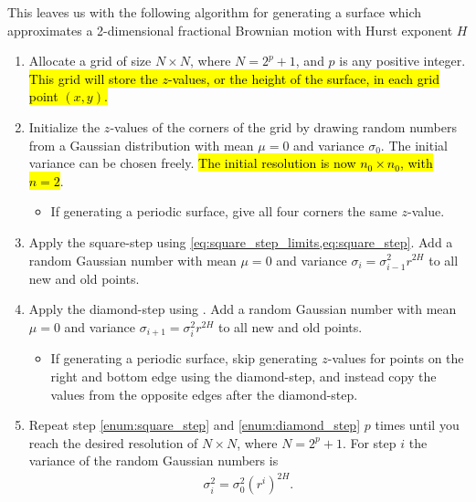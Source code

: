 This leaves us with the following algorithm for generating a surface which approximates a 2-dimensional fractional Brownian motion with Hurst exponent $H$
\begin{enumerate}
    \renewcommand{\labelitemii}{$\bullet$}
    
    \item Allocate a grid of size $N\times N$, where $N = 2^p + 1$, and $p$ is any positive integer. \hl{This grid will store the $z$-values, or the height of the surface, in each grid point $(x,y)$.}

    \item Initialize the $z$-values of the corners of the grid by drawing random numbers from a Gaussian distribution with mean $\mu = 0$ and variance $\sigma_0$. The initial variance can be chosen freely. \hl{The initial resolution is now $n_0\times n_0$, with $n = 2$}.
    \begin{itemize}
        \item If generating a periodic surface, give all four corners the same $z$-value.
    \end{itemize}
    
    \item Apply the square-step using \cref{eq:square_step_limits,eq:square_step}. Add a random Gaussian number with mean $\mu = 0$ and variance $\sigma_i = \sigma_{i-1}^2r^{2H}$ to all new and old points.
    \label{enum:square_step}

    \item Apply the diamond-step using . Add a random Gaussian number with mean $\mu = 0$ and variance $\sigma_{i+1} = \sigma_i^2r^{2H}$ to all new and old points.
    \label{enum:diamond_step}
    
    \begin{itemize}
        \item If generating a periodic surface, skip generating $z$-values for points on the right and bottom edge using the diamond-step, and instead copy the values from the opposite edges after the diamond-step.
    \end{itemize}
    
    \item Repeat step \ref{enum:square_step} and \ref{enum:diamond_step} $p$ times until you reach the desired resolution of $N\times N$, where $N = 2^p + 1$. For step $i$ the variance of the random Gaussian numbers is
    \begin{align*}
        \sigma_i^2 = \sigma_0^2(r^i)^{2H}.
    \end{align*}
\end{enumerate}

